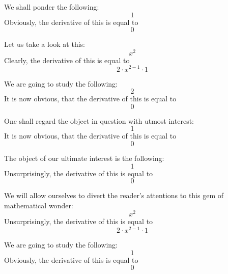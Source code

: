 \documentclass{article}
\begin{document}
We shall ponder the following:
\begin{equation}
1 
\end{equation}
Obviously, the derivative of this is equal to
\begin{equation}
0 
\end{equation}

Let us take a look at this:
\begin{equation}
x ^{2 } 
\end{equation}
Clearly, the derivative of this is equal to
\begin{equation}
2 \cdot x ^{2 - 1 } \cdot 1 
\end{equation}

We are going to study the following:
\begin{equation}
2 
\end{equation}
It is now obvious, that the derivative of this is equal to
\begin{equation}
0 
\end{equation}

One shall regard the object in question with utmost interest:
\begin{equation}
1 
\end{equation}
It is now obvious, that the derivative of this is equal to
\begin{equation}
0 
\end{equation}

The object of our ultimate interest is the following:
\begin{equation}
1 
\end{equation}
Unsurprisingly, the derivative of this is equal to
\begin{equation}
0 
\end{equation}

We will allow ourselves to divert the reader's attentions to this gem of mathematical wonder:
\begin{equation}
x ^{2 } 
\end{equation}
Unsurprisingly, the derivative of this is equal to
\begin{equation}
2 \cdot x ^{2 - 1 } \cdot 1 
\end{equation}

We are going to study the following:
\begin{equation}
1 
\end{equation}
Obviously, the derivative of this is equal to
\begin{equation}
0 
\end{equation}
\end{document}
